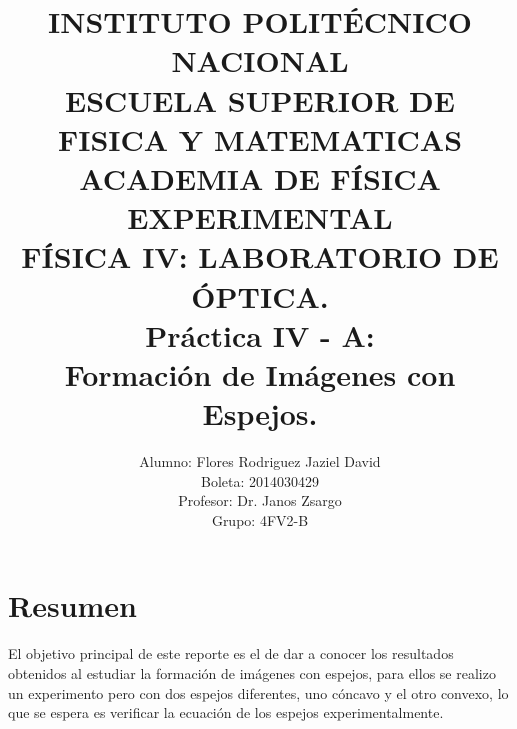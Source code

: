 \documentclass[13,twocolumn,letterpaper]{article}
\title{
    		\usefont{OT1}{bch}{b}{n}
    		\normalfont \normalsize \textsc{INSTITUTO POLITÉCNICO NACIONAL \\ 
    		ESCUELA SUPERIOR DE FISICA Y MATEMATICAS \\
    		ACADEMIA DE FÍSICA EXPERIMENTAL} \\ 
    		 	 FÍSICA IV: LABORATORIO DE ÓPTICA. \\[10pt]
    		\huge Práctica IV - A:\\
    Formación de Imágenes con Espejos.\\
    }
\author[0]{Alumno: Flores Rodriguez Jaziel David \\
    Boleta: 2014030429 \\
    Profesor: Dr. Janos Zsargo\\
    Grupo: 4FV2-B \\
            }
\begin{document}
    \maketitle
    
    
    
    \section*{Resumen}
    
    El objetivo principal de este reporte es el de dar a conocer los resultados obtenidos al estudiar la formación de imágenes con espejos, para ellos se realizo un experimento pero con dos espejos diferentes, uno cóncavo y el otro convexo, lo que se espera es verificar la ecuación de los espejos experimentalmente.\\ 
    
\end{document}
